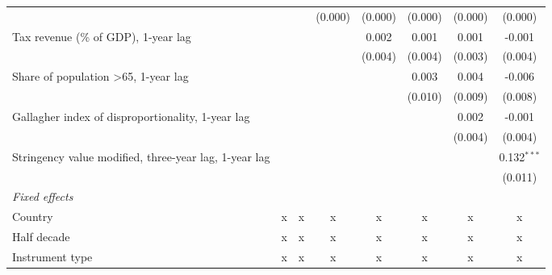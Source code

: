 \begin{tabular}{lccccccc}
                                                                          &               &               & (0.000)       & (0.000)       & (0.000)       & (0.000)       & (0.000)\\   
   Tax revenue (\% of GDP), 1-year lag                                    &               &               &               & 0.002         & 0.001         & 0.001         & -0.001\\   
                                                                          &               &               &               & (0.004)       & (0.004)       & (0.003)       & (0.004)\\   
   Share of population >65, 1-year lag                                    &               &               &               &               & 0.003         & 0.004         & -0.006\\   
                                                                          &               &               &               &               & (0.010)       & (0.009)       & (0.008)\\   
   Gallagher index of disproportionality, 1-year lag                      &               &               &               &               &               & 0.002         & -0.001\\   
                                                                          &               &               &               &               &               & (0.004)       & (0.004)\\   
   Stringency value modified, three-year lag, 1-year lag                  &               &               &               &               &               &               & 0.132$^{***}$\\   
                                                                          &               &               &               &               &               &               & (0.011)\\   
   \emph{Fixed effects}\\
   Country                                                                & x             & x             & x             & x             & x             & x             & x\\  
   Half decade                                                            & x             & x             & x             & x             & x             & x             & x\\  
   Instrument type                                                        & x             & x             & x             & x             & x             & x             & x\\  

\end{tabular}
